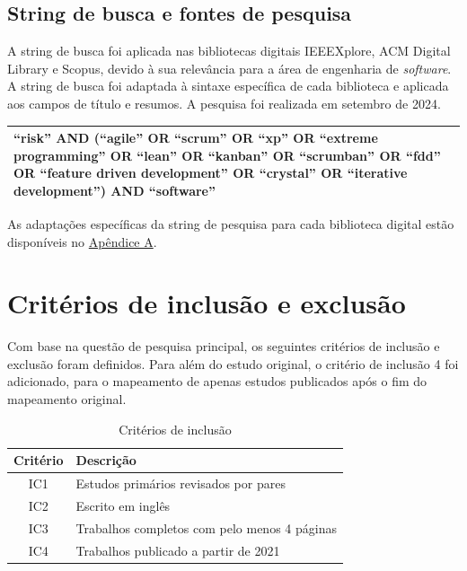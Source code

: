 \documentclass[
	12pt,
	openright,
	twoside,
	a4paper,
	english,
	brazil
	]{abntex2}
\begin{document}


\subsection{String de busca e fontes de pesquisa}

A string de busca foi aplicada nas bibliotecas digitais IEEEXplore, ACM Digital Library e Scopus, devido à sua relevância para a área de engenharia de \textit{software}. A string de busca foi adaptada à sintaxe específica de cada biblioteca e aplicada aos campos de título e resumos. A pesquisa foi realizada em setembro de 2024.

\begin{table}[h!]
  \centering
  \begin{tabular}{|p{15cm}|}
  \hline
  “risk” AND (“agile” OR “scrum” OR “xp” OR “extreme programming” OR “lean” OR “kanban” OR “scrumban” OR “fdd” OR “feature driven development” OR “crystal” OR “iterative development”) AND “software” \\ \hline
  \end{tabular}
  \label{tab:consulta-pesquisa}
\end{table}

As adaptações específicas da string de pesquisa para cada biblioteca digital estão disponíveis no \hyperref[apendiceA]{Apêndice A}.


\section{Critérios de inclusão e exclusão}

Com base na questão de pesquisa principal, os seguintes critérios de inclusão e exclusão foram definidos. Para além do estudo original, o critério de inclusão 4 foi adicionado, para o mapeamento de apenas estudos publicados após o fim do mapeamento original.

\begin{table}[H]
  \centering
  \caption{Critérios de inclusão}
  \begin{tabular}{|c|l|}
  \hline
  \textbf{Critério} & \textbf{Descrição} \\ \hline
  IC1 & Estudos primários revisados por pares \\ \hline
  IC2 & Escrito em inglês \\ \hline
  IC3 & Trabalhos completos com pelo menos 4 páginas \\ \hline
  IC4 & Trabalhos publicado a partir de 2021 \\ \hline
  \end{tabular}
\end{table}
\end{document}
